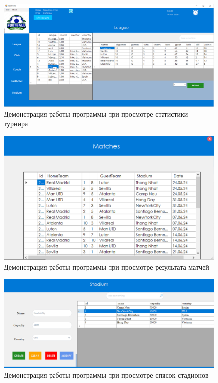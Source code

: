 \begin{figure}[h]
	\centering
	\includegraphics[height=0.3\textheight]{img/examples/demon3.png}
	\caption{Демонстрация работы программы при просмотре статистики турнира}
	\label{img:ex4}
\end{figure}

\begin{figure}[h]
	\centering
	\includegraphics[height=0.3\textheight]{img/examples/demon5.png}
	\caption{Демонстрация работы программы при просмотре результата матчей}
	\label{img:ex5}
\end{figure}

\begin{figure}[h]
	\centering
	\includegraphics[height=0.25\textheight]{img/examples/demon6.png}
	\caption{Демонстрация работы программы при просмотре список стадионов}
	\label{img:ex6}
\end{figure}
\clearpage
